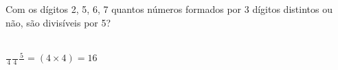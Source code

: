 \begin{ex}
 Com os dígitos 2, 5, 6, 7 quantos números formados por 3 dígitos distintos ou não, são divisíveis por 5?
  \begin{sol}
      \phantom{A} \\
  $\frac{\phantom{A}}{4}\frac{\phantom{A}}{4}\frac{5}{\phantom{A}} =(4\times4)= 16$
  \end{sol}
\end{ex}